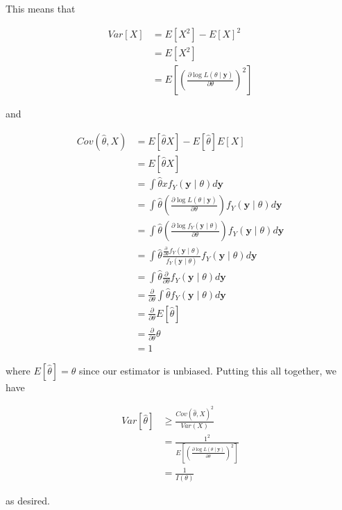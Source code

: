 \documentclass[
  letterpaper,
  DIV=11,
  numbers=noendperiod]{scrreprt}
\begin{document}
This means that

\begin{align*}
    Var[X] & = E[X^2] - E[X]^2 \\
    & = E[X^2] \\
    & = E \left[ \left( \frac{\partial \log L(\theta \mid \textbf{y})}{\partial \theta} \right)^2\right ]
\end{align*}

and

\begin{align*}
    Cov(\hat{\theta}, X) & = E[\hat{\theta} X] - E[\hat{\theta}] E[X] \\
    & = E[\hat{\theta}X] \\
    & = \int \hat{\theta} x f_Y(\textbf{y} \mid \theta) d\textbf{y} \\
    & = \int \hat{\theta} \left( \frac{\partial \log L(\theta \mid \textbf{y})}{\partial \theta} \right) f_Y(\textbf{y} \mid \theta) d\textbf{y} \\
    & = \int \hat{\theta} \left( \frac{\partial \log f_Y(\textbf{y} \mid \theta)}{\partial \theta} \right) f_Y(\textbf{y} \mid \theta) d\textbf{y} \\
    & = \int \hat{\theta} \frac{\frac{\partial}{\partial \theta} f_Y(\textbf{y} \mid \theta)}{ f_Y(\textbf{y} \mid \theta)} f_Y(\textbf{y} \mid \theta) d\textbf{y} \\
    & = \int \hat{\theta} \frac{\partial}{\partial \theta} f_Y(\textbf{y} \mid \theta) d\textbf{y}  \\
    & = \frac{\partial}{\partial \theta} \int \hat{\theta} f_Y(\textbf{y} \mid \theta) d\textbf{y}  \\
    & =  \frac{\partial}{\partial \theta} E[\hat{\theta}] \\
    & = \frac{\partial}{\partial \theta} \theta \\
    & = 1
\end{align*}

where \(E[\hat{\theta}] = \theta\) since our estimator is unbiased.
Putting this all together, we have

\begin{align*}
    Var[\hat{\theta}] & \geq \frac{Cov(\hat{\theta},X)^2}{Var(X)} \\
    & = \frac{1^2}{E \left[ \left( \frac{\partial \log L(\theta \mid \textbf{y})}{\partial \theta} \right)^2\right ]} \\
    & = \frac{1}{I(\theta)}
\end{align*}

as desired.
\end{document}
